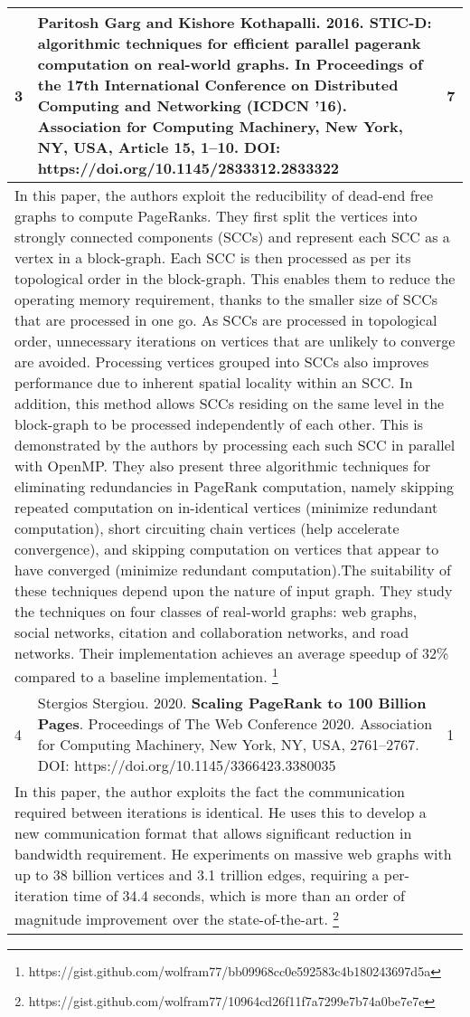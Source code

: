 \begin{longtable}[!hbtp]{|p{1cm}|p{11cm}|p{2cm}|}
  3 &
  Paritosh Garg and Kishore Kothapalli. 2016. \textbf{STIC-D: algorithmic techniques for efficient parallel pagerank computation on real-world graphs}. In Proceedings of the 17th International Conference on Distributed Computing and Networking (ICDCN '16). Association for Computing Machinery, New York, NY, USA, Article 15, 1–10.\linebreak
  DOI: https://doi.org/10.1145/2833312.2833322 &
  7 \\ \hline
  \multicolumn{3}{|p{14cm}|}{In this paper, the authors exploit the reducibility of dead-end free graphs to compute PageRanks. They first split the vertices into strongly connected components (SCCs) and represent each SCC as a vertex in a block-graph. Each SCC is then processed as per its topological order in the block-graph. This enables them to reduce the operating memory requirement, thanks to the smaller size of SCCs that are processed in one go. As SCCs are processed in topological order, unnecessary iterations on vertices that are unlikely to converge are avoided. Processing vertices grouped into SCCs also improves performance due to inherent spatial locality within an SCC. In addition, this method allows SCCs residing on the same level in the block-graph to be processed independently of each other. This is demonstrated by the authors by processing each such SCC in parallel with OpenMP. They also present three algorithmic techniques for eliminating redundancies in PageRank computation, namely skipping repeated computation on in-identical vertices (minimize redundant computation), short circuiting chain vertices (help accelerate convergence), and skipping computation on vertices that appear to have converged (minimize redundant computation).The suitability of these techniques depend upon the nature of input graph. They study the techniques on four classes of real-world graphs: web graphs, social networks, citation and collaboration networks, and road networks. Their implementation achieves an average speedup of 32\% compared to a baseline implementation. \footnote{https://gist.github.com/wolfram77/bb09968cc0e592583c4b180243697d5a}} \\ \hline

  4 &
  Stergios Stergiou. 2020. \textbf{Scaling PageRank to 100 Billion Pages}. Proceedings of The Web Conference 2020. Association for Computing Machinery, New York, NY, USA, 2761–2767.\linebreak
  DOI: https://doi.org/10.1145/3366423.3380035 &
  1 \\ \hline
  \multicolumn{3}{|p{14cm}|}{In this paper, the author exploits the fact the communication required between iterations is identical. He uses this to develop a new communication format that allows significant reduction in bandwidth requirement. He experiments on massive web graphs with up to 38 billion vertices and 3.1 trillion edges, requiring a per-iteration time of 34.4 seconds, which is more than an order of magnitude improvement over the state-of-the-art. \footnote{https://gist.github.com/wolfram77/10964cd26f11f7a7299e7b74a0be7e7e}} \\ \hline


\end{longtable}
